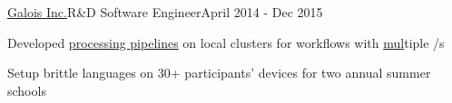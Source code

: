 \documentclass{article}
\newenvironment{**mylist}[4][]%
{%
\subsubsection*{%
    \censor{#2}\tabb #3%
    \if\relax\detokenize{#1}\relax
    \else
      {\;\;(#1)}%
    \fi
    \hfill #4%
}%

\small
  \begin{itemize}%
    \setlength{\topsep}{.2pt}%
    \setlength{\partopsep}{0pt}
    \setlength{\itemsep}{.6pt}%
    \setlength{\parskip}{0pt}%
    \setlength{\parsep}{0pt}%
}%
{%
  \end{itemize}%
}
\def\PT{{\bf(Part Time)}\xspace}
\begin{document}

\begin{**mylist}[Security]{\href{http://galois.com}{Galois Inc.}}{R\&D Software Engineer}{April 2014 - Dec 2015}
\item Developed \href{https://github.com/probinso/ppaml-eval-tools}{processing pipelines} on local clusters for
   workflows with \href{https://www.darpa.mil/research/programs/probabilistic-programming-for-advancing-machine-Learning}{m}\href{https://galois.com/news/galois-awarded-10m-darpa-contract-make-legacy-systems-secure/}{u}\href{https://www.darpa.mil/program/safeware}{l}tiple /s
\item Setup brittle  languages on 30+ participants’ devices for two annual  summer schools

\end{**mylist}
\end{document}
